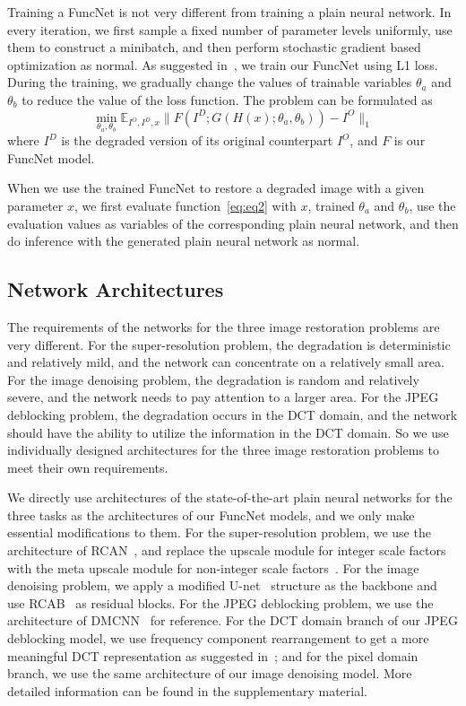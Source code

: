 \documentclass{article}
\begin{document}
Training a FuncNet is not very different from training a plain neural network. In every iteration, we first sample a fixed number of parameter levels uniformly, use them to construct a minibatch, and then perform stochastic gradient based optimization as normal. As suggested in~\cite{zhao2015loss}, we train our FuncNet using L1 loss. During the training, we gradually change the values of trainable variables $\theta_a$ and $\theta_b$ to reduce the value of the loss function. The problem can be formulated as
\begin{equation} \label{eq:eq3}
\min_{\theta_a, \theta_b} \mathbb{E}_{I^O,I^D,x} \lVert F(I^D;G(H(x); \theta_a, \theta_b))-I^O \rVert_1
\end{equation}
where $I^D$ is the degraded version of its original counterpart $I^O$, and $F$ is our FuncNet model.

When we use the trained FuncNet to restore a degraded image with a given parameter $x$, we first evaluate function~\ref{eq:eq2} with $x$, trained $\theta_a$ and $\theta_b$, use the evaluation values as variables of the corresponding plain neural network, and then do inference with the generated plain neural network as normal.

\subsection{Network Architectures}

The requirements of the networks for the three image restoration problems are very different. For the super-resolution problem, the degradation is deterministic and relatively mild, and the network can concentrate on a relatively small area. For the image denoising problem, the degradation is random and relatively severe, and the network needs to pay attention to a larger area. For the JPEG deblocking problem, the degradation occurs in the DCT domain, and the network should have the ability to utilize the information in the DCT domain. So we use individually designed architectures for the three image restoration problems to meet their own requirements.

We directly use architectures of the state-of-the-art plain neural networks for the three tasks as the architectures of our FuncNet models, and we only make essential modifications to them. For the super-resolution problem, we use the architecture of RCAN~\cite{zhang2018image}, and replace the upscale module for integer scale factors~\cite{shi2016real} with the meta upscale module for non-integer scale factors~\cite{hu2019meta}. For the image denoising problem, we apply a modified U-net~\cite{ronneberger2015u} structure as the backbone and use RCAB~\cite{zhang2018image} as residual blocks. For the JPEG deblocking problem, we use the architecture of DMCNN~\cite{zhang2018dmcnn} for reference. For the DCT domain branch of our JPEG deblocking model, we use frequency component rearrangement to get a more meaningful DCT representation as suggested in~\cite{ehrlich2020quantization}; and for the pixel domain branch, we use the same architecture of our image denoising model. More detailed information can be found in the supplementary material.
\end{document}
